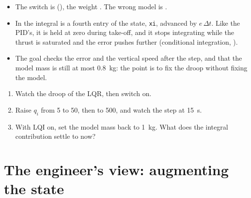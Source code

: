 
\begin{inapp}
\begin{itemize}[leftmargin=1.2em]
  \item The switch is  (), the weight . The wrong model is .
  \item In  the integral is a fourth entry of the state, \texttt{xi}, advanced by $e\,\Delta t$. Like the PID's, it is held at zero during take-off, and it stops integrating while the thrust is saturated and the error pushes further (conditional integration, ).
  \item The goal checks the error and the vertical speed after the step, and that the model mass is still at most \SI{0.8}{kg}: the point is to fix the droop without fixing the model.
\end{itemize}
\end{inapp}

\begin{trythis}
\begin{enumerate}
  \item Watch the droop of the LQR, then switch  on.
  \item Raise $q_i$ from 5 to 50, then to 500, and watch the step at \SI{15}{s}.
  \item With LQI on, set the model mass back to \SI{1}{kg}. What does the integral contribution settle to now?
\end{enumerate}
\end{trythis}

\section{The engineer's view: augmenting the state}

